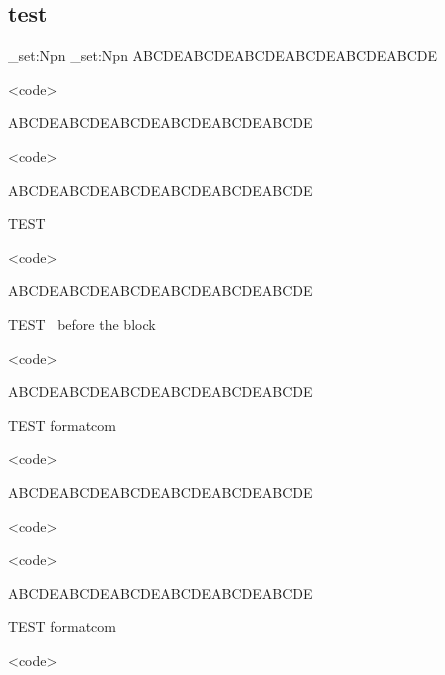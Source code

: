 \subsection{ test}
\bgroup
\makeatletter
\ExplSyntaxOn
\def\CDR@Debug#1{\typeout{**** DEBUG #1}}
\cs_set:Npn 
%
\cs_set:Npn 
\ExplSyntaxOff
{}
\makeatother
ABCDEABCDEABCDEABCDEABCDEABCDE
\begin{CDRBlockX}
<code>
\end{CDRBlockX}
ABCDEABCDEABCDEABCDEABCDEABCDE
\begin{CDRBlockX}[formatcom=\color{magenta}]
<code>
\end{CDRBlockX}
ABCDEABCDEABCDEABCDEABCDEABCDE
\begin{codebox}{TEST}
\begin{CDRBlockX}
<code>
\end{CDRBlockX}
\end{codebox}
ABCDEABCDEABCDEABCDEABCDEABCDE
\begin{codebox}{TEST \string\color\ before the block}
\color{magenta}
\begin{CDRBlockX}
<code>
\end{CDRBlockX}
\end{codebox}
ABCDEABCDEABCDEABCDEABCDEABCDE
\begin{codebox}{TEST formatcom}
\begin{CDRBlockX}[formatcom=\color{magenta}]
<code>
\end{CDRBlockX}
\end{codebox}
ABCDEABCDEABCDEABCDEABCDEABCDE
\begin{CDRBlockX}
<code>
\end{CDRBlockX}
\begin{CDRBlockX}
<code>
\end{CDRBlockX}
ABCDEABCDEABCDEABCDEABCDEABCDE
\begin{codebox}{TEST formatcom}
\begin{CDRBlock}[formatcom=\color{magenta}]
<code>
\end{CDRBlock}
\end{codebox}
\egroup
%
%
